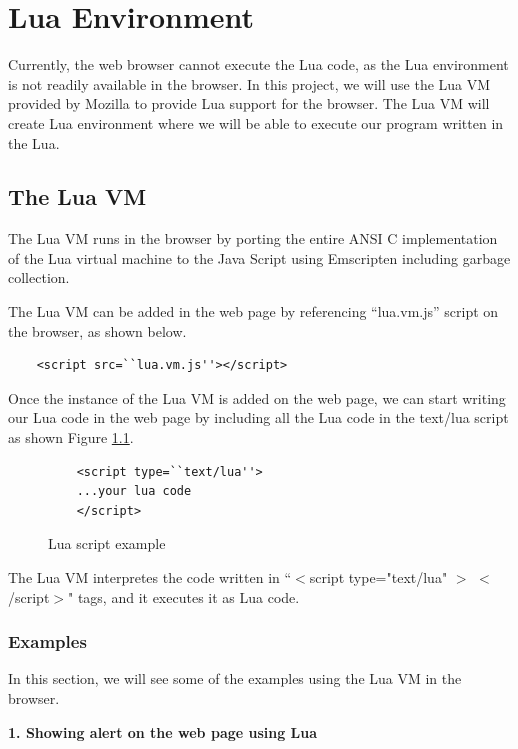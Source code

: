\chapter{Lua Environment} \label{lua}

Currently, the web browser cannot execute the Lua code, as the Lua environment is not readily available in the browser. In this project, we will use the Lua VM provided by Mozilla \cite{luavm} to provide Lua support for the browser. The Lua VM will create Lua environment where we will be able to execute our program written in the Lua.

\section{The Lua VM}

The Lua VM runs in the browser by porting the entire ANSI C implementation of the Lua virtual machine to the Java Script using Emscripten \cite{emscripten} including garbage collection.

The Lua VM can be added in the web page by referencing ``lua.vm.js'' script on the browser, as shown below.

\begin{lstlisting}
    <script src=``lua.vm.js''></script>
\end{lstlisting}

Once the instance of the Lua VM is added on the web page, we can start writing our Lua code in the web page by including all the Lua code in the text/lua script as shown Figure \ref{fig:luascript}.

\begin{figure}[h]
	\begin{lstlisting}
	<script type=``text/lua''>
	...your lua code
	</script>
	\end{lstlisting}
	\caption{Lua script example}
	\label{fig:luascript}
\end{figure}

The Lua VM interpretes the code written in ``$<$script type="text/lua" $>$ $<$/script$>$" tags, and it executes it as Lua code.

\subsection{Examples}

In this section, we will see some of the examples using the Lua VM in the browser.

\textbf{1. Showing alert on the web page using Lua}

